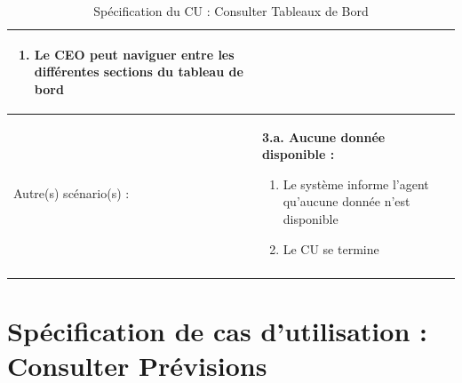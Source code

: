 \begin{longtable}{|>{\bfseries\raggedright\arraybackslash}p{3.5cm}|p{\dimexpr\textwidth-3.5cm-4\tabcolsep-2\arrayrulewidth}|}
\begin{enumerate}[leftmargin=1.5em, topsep=2pt, itemsep=1pt]
  \item Le CEO peut naviguer entre les différentes sections du tableau de bord
\end{enumerate} \\
\hline
Autre(s) scénario(s) : &
\textbf{3.a. Aucune donnée disponible :}
\begin{enumerate}[leftmargin=1.5em, topsep=2pt, itemsep=1pt]
  \item Le système informe l'agent qu'aucune donnée n'est disponible
  \item Le CU se termine
\end{enumerate} \\
\hline
\caption{Spécification du CU : Consulter Tableaux de Bord}
\label{tab:cu-tableaux-bord}
\end{longtable}

\newpage
\section{Spécification de cas d'utilisation : Consulter Prévisions}

